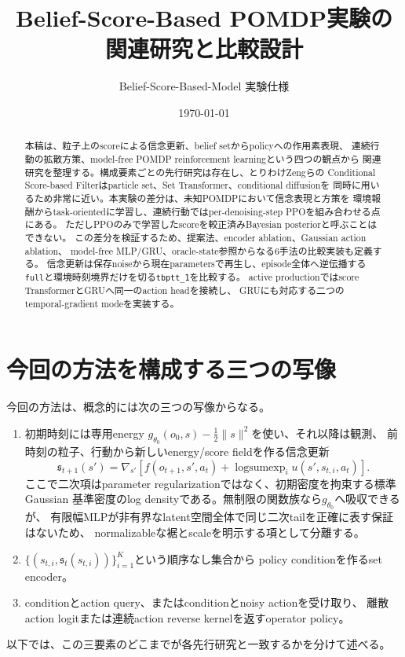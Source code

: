 \documentclass[a4paper,11pt]{article}
\title{Belief-Score-Based POMDP実験の関連研究と比較設計}
\author{Belief-Score-Based-Model 実験仕様}
\date{\today}
\begin{document}
\maketitle

\begin{abstract}
本稿は、粒子上のscoreによる信念更新、belief setからpolicyへの作用素表現、
連続行動の拡散方策、model-free POMDP reinforcement learningという四つの観点から
関連研究を整理する。構成要素ごとの先行研究は存在し、とりわけZengらの
Conditional Score-based Filterはparticle set、Set Transformer、conditional diffusionを
同時に用いるため非常に近い。本実験の差分は、未知POMDPにおいて信念表現と方策を
環境報酬からtask-orientedに学習し、連続行動ではper-denoising-step PPOを組み合わせる点にある。
ただしPPOのみで学習したscoreを較正済みBayesian posteriorと呼ぶことはできない。
この差分を検証するため、提案法、encoder ablation、Gaussian action ablation、
model-free MLP/GRU、oracle-state参照からなる6手法の比較実装も定義する。
信念更新は保存noiseから現在parametersで再生し、episode全体へ逆伝播する
\texttt{full}と環境時刻境界だけを切る\texttt{tbptt\_1}を比較する。
active productionではscore TransformerとGRUへ同一のaction headを接続し、
GRUにも対応する二つのtemporal-gradient modeを実装する。
\end{abstract}

\section{今回の方法を構成する三つの写像}

今回の方法は、概念的には次の三つの写像からなる。
\begin{enumerate}
  \item 初期時刻には専用energy
  $g_{\theta_0}(o_0,s)-\frac12\lVert s\rVert^2$を使い、それ以降は観測、
  前時刻の粒子、行動から新しいenergy/score fieldを作る信念更新
  \begin{equation}
    \mathfrak{s}_{t+1}(s')
    =\nabla_{s'}\left[
      f(o_{t+1},s',a_t)
      +\operatorname{logsumexp}_{i}u(s',s_{t,i},a_t)
    \right].
    \label{eq:proposed-score}
  \end{equation}
  ここで二次項はparameter regularizationではなく、初期密度を拘束する標準Gaussian
  基準密度のlog densityである。無制限の関数族なら$g_{\theta_0}$へ吸収できるが、
  有限幅MLPが非有界なlatent空間全体で同じ二次tailを正確に表す保証はないため、
  normalizableな裾とscaleを明示する項として分離する。
  \item $\{(s_{t,i},\mathfrak{s}_t(s_{t,i}))\}_{i=1}^{K}$という順序なし集合から
    policy conditionを作るset encoder。
  \item conditionとaction query、またはconditionとnoisy actionを受け取り、
    離散action logitまたは連続action reverse kernelを返すoperator policy。
\end{enumerate}
以下では、この三要素のどこまでが各先行研究と一致するかを分けて述べる。
\end{document}
